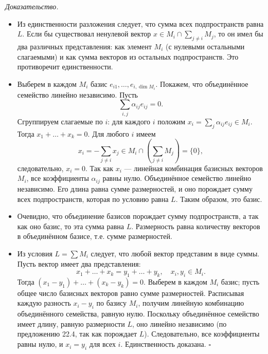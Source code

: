 \documentclass[a4paper,12pt]{article}
\theoremstyle{definition}
\theoremstyle{plain}
\theoremstyle{remark}
\begin{document}
	\medskip
	\textit{Доказательство.}
	\begin{itemize}
		\item[1 \(\Rightarrow\) 2.] Из единственности разложения следует, что сумма всех подпространств равна \( L \). Если бы существовал ненулевой вектор \( x \in M_i \cap \sum_{j \neq i} M_j \), то он имел бы два различных представления: как элемент \( M_i \) (с нулевыми остальными слагаемыми) и как сумма векторов из остальных подпространств. Это противоречит единственности.
		
		\item[2 \(\Rightarrow\) 3.] Выберем в каждом \( M_i \) базис \( e_{i1}, \dots, e_{i, \dim M_i} \). Покажем, что объединённое семейство линейно независимо. Пусть
		\[
		\sum_{i,j} \alpha_{ij} e_{ij} = 0.
		\]
		Сгруппируем слагаемые по \( i \): для каждого \( i \) положим \( x_i = \sum_j \alpha_{ij} e_{ij} \in M_i \). Тогда \( x_1 + \dots + x_k = 0 \). Для любого \( i \) имеем
		\[
		x_i = -\sum_{j \neq i} x_j \in M_i \cap \left( \sum_{j \neq i} M_j \right) = \{0\},
		\]
		следовательно, \( x_i = 0 \). Так как \( x_i \) — линейная комбинация базисных векторов \( M_i \), все коэффициенты \( \alpha_{ij} \) равны нулю. Объединённое семейство линейно независимо. Его длина равна сумме размерностей, и оно порождает сумму всех подпространств, которая по условию равна \( L \). Таким образом, это базис.
		
		\item[3 \(\Rightarrow\) 4.] Очевидно, что объединение базисов порождает сумму подпространств, а так как оно базис, то эта сумма равна \( L \). Размерность равна количеству векторов в объединённом базисе, т.е. сумме размерностей.
		
		\item[4 \(\Rightarrow\) 1.] Из условия \( L = \sum M_i \) следует, что любой вектор представим в виде суммы. Пусть вектор имеет два представления:
		\[
		x_1 + \dots + x_k = y_1 + \dots + y_k, \quad x_i, y_i \in M_i.
		\]
		Тогда \( (x_1 - y_1) + \dots + (x_k - y_k) = 0 \). Выберем в каждом \( M_i \) базис; пусть общее число базисных векторов равно сумме размерностей. Расписывая каждую разность \( x_i - y_i \) по базису \( M_i \), получим линейную комбинацию объединённого семейства, равную нулю. Поскольку объединённое семейство имеет длину, равную размерности \( L \), оно линейно независимо (по предложению 22.4, так как порождает \( L \)). Следовательно, все коэффициенты равны нулю, и \( x_i = y_i \) для всех \( i \). Единственность доказана. \hfill \(\square\)
	\end{itemize}
	
\end{document}
